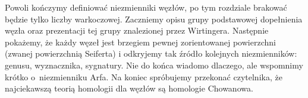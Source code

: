 
Powoli kończymy definiować niezmienniki węzłów, po tym rozdziale brakować będzie tylko liczby warkoczowej.
Zaczniemy opisu grupy podstawowej dopełnienia węzła oraz prezentacji tej grupy znalezionej przez Wirtingera.
Następnie pokażemy, że każdy węzeł jest brzegiem pewnej zorientowanej powierzchni (zwanej powierzchnią Seiferta) i odkryjemy tak źródło kolejnych niezmienników: genusu, wyznacznika, sygnatury.
Nie do końca wiadomo dlaczego, ale wspomnimy krótko o~niezmienniku Arfa.
Na koniec spróbujemy przekonać czytelnika, że najciekawszą teorią homologii dla węzłów są homologie Chowanowa.


